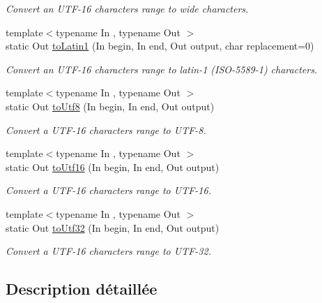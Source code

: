 \begin{DoxyCompactItemize}
\begin{DoxyCompactList}\small\item\em Convert an U\+T\+F-\/16 characters range to wide characters. \end{DoxyCompactList}\item 
{\footnotesize template$<$typename In , typename Out $>$ }\\static Out \hyperlink{classsf_1_1Utf_3_0116_01_4_ad0cc57ebf48fac584f4d5f3d30a20010}{to\+Latin1} (In begin, In end, Out output, char replacement=0)
\begin{DoxyCompactList}\small\item\em Convert an U\+T\+F-\/16 characters range to latin-\/1 (I\+S\+O-\/5589-\/1) characters. \end{DoxyCompactList}\item 
{\footnotesize template$<$typename In , typename Out $>$ }\\static Out \hyperlink{classsf_1_1Utf_3_0116_01_4_afdd2f31536ce3fba4dfb632dfdd6e4b7}{to\+Utf8} (In begin, In end, Out output)
\begin{DoxyCompactList}\small\item\em Convert a U\+T\+F-\/16 characters range to U\+T\+F-\/8. \end{DoxyCompactList}\item 
{\footnotesize template$<$typename In , typename Out $>$ }\\static Out \hyperlink{classsf_1_1Utf_3_0116_01_4_a0c9744c8f142360a8afebb24da134b34}{to\+Utf16} (In begin, In end, Out output)
\begin{DoxyCompactList}\small\item\em Convert a U\+T\+F-\/16 characters range to U\+T\+F-\/16. \end{DoxyCompactList}\item 
{\footnotesize template$<$typename In , typename Out $>$ }\\static Out \hyperlink{classsf_1_1Utf_3_0116_01_4_a781174f776a3effb96c1ccd9a4513ab1}{to\+Utf32} (In begin, In end, Out output)
\begin{DoxyCompactList}\small\item\em Convert a U\+T\+F-\/16 characters range to U\+T\+F-\/32. \end{DoxyCompactList}\end{DoxyCompactItemize}


\subsection{Description détaillée}
